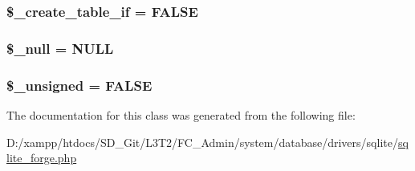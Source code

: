 \subsubsection[{\$\+\_\+create\+\_\+table\+\_\+if}]{\setlength{\rightskip}{0pt plus 5cm}\$\+\_\+create\+\_\+table\+\_\+if = F\+A\+L\+S\+E\hspace{0.3cm}{\ttfamily [protected]}}\label{class_c_i___d_b__sqlite__forge_a2f6484fcb8d1dc3eef67a637227cd583}
\hypertarget{class_c_i___d_b__sqlite__forge_ae58fe6a5104d4a069a49b27533ce808f}{}
\subsubsection[{\$\+\_\+null}]{\setlength{\rightskip}{0pt plus 5cm}\$\+\_\+null = \textquotesingle{}N\+U\+L\+L\textquotesingle{}\hspace{0.3cm}{\ttfamily [protected]}}\label{class_c_i___d_b__sqlite__forge_ae58fe6a5104d4a069a49b27533ce808f}
\hypertarget{class_c_i___d_b__sqlite__forge_aae977ae6d61fa183f0b25422b6ddc31c}{}
\subsubsection[{\$\+\_\+unsigned}]{\setlength{\rightskip}{0pt plus 5cm}\$\+\_\+unsigned = F\+A\+L\+S\+E\hspace{0.3cm}{\ttfamily [protected]}}\label{class_c_i___d_b__sqlite__forge_aae977ae6d61fa183f0b25422b6ddc31c}


The documentation for this class was generated from the following file\+:\begin{DoxyCompactItemize}
\item 
D\+:/xampp/htdocs/\+S\+D\+\_\+\+Git/\+L3\+T2/\+F\+C\+\_\+\+Admin/system/database/drivers/sqlite/\hyperlink{sqlite__forge_8php}{sqlite\+\_\+forge.\+php}\end{DoxyCompactItemize}
